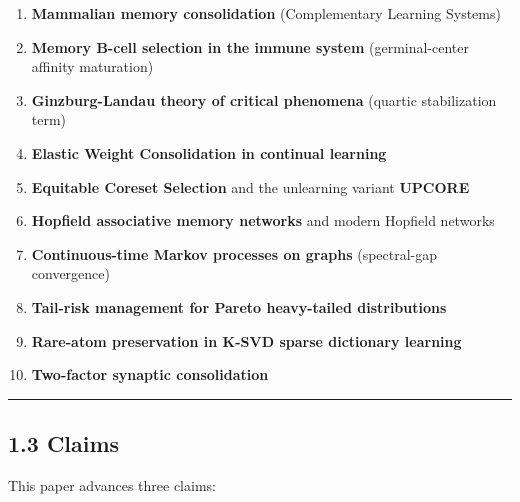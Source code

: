 \begin{enumerate}
\def\labelenumi{\arabic{enumi}.}
\tightlist
\item
  \textbf{Mammalian memory consolidation} (Complementary Learning Systems) \citep{mcclelland1995cls}
\item
  \textbf{Memory B-cell selection in the immune system} (germinal-center affinity maturation)
\item
  \textbf{Ginzburg-Landau theory of critical phenomena} (quartic stabilization term)
\item
  \textbf{Elastic Weight Consolidation in continual learning} \citep{kirkpatrick2017ewc}
\item
  \textbf{Equitable Coreset Selection} \citep{wang2024ecs} and the unlearning variant \textbf{UPCORE} \citep{patil2025upcore}
\item
  \textbf{Hopfield associative memory networks} \citep{hopfield1982neural} and modern Hopfield networks \citep{ramsauer2021hopfield}
\item
  \textbf{Continuous-time Markov processes on graphs} (spectral-gap convergence)
\item
  \textbf{Tail-risk management for Pareto heavy-tailed distributions} \citep{pareto1896economie}
\item
  \textbf{Rare-atom preservation in K-SVD sparse dictionary learning} \citep{aharon2006ksvd}
\item
  \textbf{Two-factor synaptic consolidation} \citep{tartaglia2025twofactor}
\end{enumerate}

\begin{center}\rule{0.5\linewidth}{0.5pt}\end{center}

\subsection{1.3 Claims}\label{claims}

This paper advances three claims:

